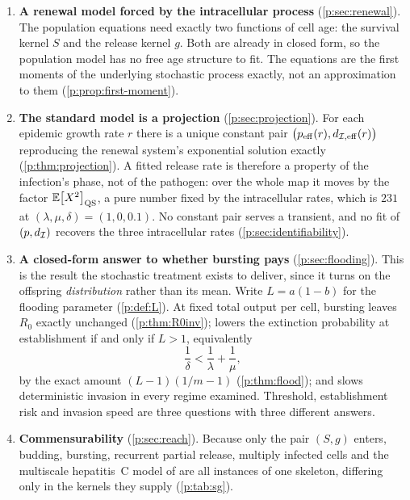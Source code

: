 \begin{enumerate}[leftmargin=1.9em]
\item \textbf{A renewal model forced by the intracellular process}
(\cref{p:sec:renewal}). The population equations need exactly two functions
of cell age: the survival kernel $S$ and the release kernel $g$. Both are
already in closed form, so the population model has no free age structure to
fit. The equations are the first moments of the underlying stochastic
process exactly, not an approximation to them
(\cref{p:prop:first-moment}).

\item \textbf{The standard model is a projection}
(\cref{p:sec:projection}). For each epidemic growth rate $r$ there is a
unique constant pair $\bigl(p_{\rm eff}(r),d_{\mathcal{I},{\rm eff}}(r)\bigr)$
reproducing the renewal system's exponential solution exactly
(\cref{p:thm:projection}). A fitted release rate is therefore a property of
the infection's phase, not of the pathogen: over the whole map it moves by
the factor $\mathbb{E}\!\left[X^2\right]_{\rm QS}$, a pure number fixed by the intracellular
rates, which is $231$ at $(\lambda,\mu,\delta)=(1,0,0.1)$. No constant pair
serves a transient, and no fit of $(p,d_{\mathcal{I}})$ recovers the three
intracellular rates (\cref{p:sec:identifiability}).

\item \textbf{A closed-form answer to whether bursting pays}
(\cref{p:sec:flooding}). This is the result the stochastic treatment exists
to deliver, since it turns on the offspring \emph{distribution} rather than
its mean. Write $L=a(1-b)$ for the flooding parameter
(\cref{p:def:L}). At fixed total output per cell, bursting leaves $R_0$
exactly unchanged (\cref{p:thm:R0inv}); lowers the extinction probability at
establishment if and only if $L>1$, equivalently
\begin{equation*}
\frac{1}{\delta}<\frac{1}{\lambda}+\frac{1}{\mu},
\end{equation*}
by the exact amount $(L-1)(1/m-1)$ (\cref{p:thm:flood}); and slows
deterministic invasion in every regime examined. Threshold, establishment
risk and invasion speed are three questions with three different answers.

\item \textbf{Commensurability} (\cref{p:sec:reach}). Because only the pair
$(S,g)$ enters, budding, bursting, recurrent partial release, multiply
infected cells and the multiscale hepatitis~C model of
\cite{guedj2013modeling,rong2013mathematical} are all instances of one
skeleton, differing only in the kernels they supply
(\cref{p:tab:sg}).
\end{enumerate}

